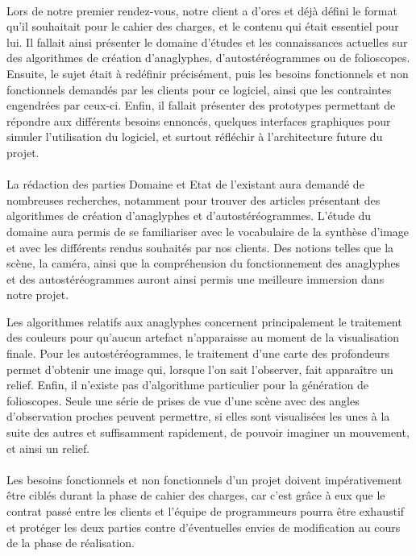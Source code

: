 	\paragraph{} 
        Lors de notre premier rendez-vous, notre client a d'ores et déjà défini le format qu'il souhaitait pour le cahier des charges, et le contenu qui était essentiel pour lui. Il fallait ainsi présenter le domaine d'études et les connaissances actuelles sur des algorithmes de création d'anaglyphes, d'autostéréogrammes ou de folioscopes. Ensuite, le sujet était à redéfinir précisément, puis les besoins fonctionnels et non fonctionnels demandés par les clients pour ce logiciel, ainsi que les contraintes engendrées par ceux-ci. Enfin, il fallait présenter des prototypes permettant de répondre aux différents besoins ennoncés, quelques interfaces graphiques pour simuler l'utilisation du logiciel, et surtout réfléchir à l'architecture future du projet.

\paragraph{}
        La rédaction des parties Domaine et Etat de l'existant aura demandé de nombreuses recherches, notamment pour trouver des articles présentant des algorithmes de création d'anaglyphes et d'autostéréogrammes. 
	L'étude du domaine aura permis de se familiariser avec le vocabulaire de la synthèse d'image et avec les différents rendus souhaités par nos clients. Des notions telles que la scène, la caméra, ainsi que la compréhension du fonctionnement des anaglyphes et des autostéréogrammes auront ainsi permis une meilleure immersion dans notre projet.

	Les algorithmes relatifs aux anaglyphes concernent principalement le traitement des couleurs pour qu'aucun artefact n'apparaisse au moment de la visualisation finale. Pour les autostéréogrammes, le traitement d'une carte des profondeurs permet d'obtenir une image qui, lorsque l'on sait l'observer, fait apparaître un relief. Enfin, il n'existe pas d'algorithme particulier pour la génération de folioscopes. Seule une série de prises de vue d'une scène avec des angles d'observation proches peuvent permettre, si elles sont visualisées les unes à la suite des autres et suffisamment rapidement, de pouvoir imaginer un mouvement, et ainsi un relief.

\paragraph{}
        Les besoins fonctionnels et non fonctionnels d'un projet doivent impérativement être ciblés durant la phase de cahier des charges, car c'est grâce à eux que le contrat passé entre les clients et l'équipe de programmeurs pourra être exhaustif et protéger les deux parties contre d'éventuelles envies de modification au cours de la phase de réalisation. 
        
